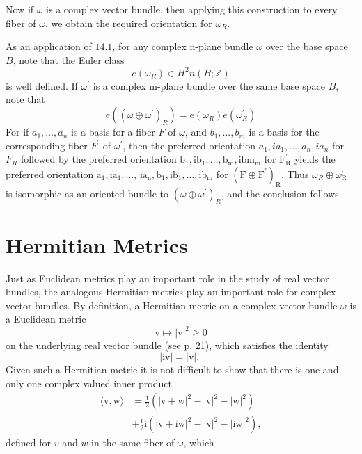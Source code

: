 \documentclass[10pt]{article}
\begin{document}
Now if $\omega$ is a complex vector bundle, then applying this construction to every fiber of $\omega$, we obtain the required orientation for $\omega_{R}$.

As an application of $14.1$, for any complex n-plane bundle $\omega$ over the base space $B$, note that the Euler class
$$
e\left(\omega_{R}\right) \in H^{2} n(B ; \mathbb{Z})
$$
is well defined. If $\omega^{\prime}$ is a complex m-plane bundle over the same base space $B$, note that
$$
e\left(\left(\omega \oplus \omega^{\prime}\right)_{R}\right)=e\left(\omega_{R}\right) e\left(\omega_{R}^{\prime}\right)
$$
For if $a_{1}, \ldots, a_{n}$ is a basis for a fiber $F$ of $\omega$, and $b_{1}, \ldots, b_{m}$ is a basis for the corresponding fiber $F^{\prime}$ of $\omega^{\prime}$, then the preferred orientation $a_{1}, i a_{1}, \ldots, a_{n}, i a_{n}$ for $F_{R}$ followed by the preferred orientation $\mathrm{b}_{1}, \mathrm{ib}_{1}, \ldots, \mathrm{b}_{\mathrm{m}}, \mathrm{ib} \mathrm{m}_{\mathrm{m}}$ for $\mathrm{F}_{\mathrm{R}}^{\prime}$ yields the preferred orientation $\mathrm{a}_{1}, \mathrm{ia}_{1}, \ldots$, $\mathrm{ia}_{\mathrm{n}}, \mathrm{b}_{1}, \mathrm{ib}_{1}, \ldots, \mathrm{ib}_{\mathrm{m}}$ for $\left(\mathrm{F} \oplus \mathrm{F}^{\prime}\right)_{\mathrm{R}}$. Thus $\omega_{R} \oplus \omega_{\mathrm{R}}^{\prime}$ is isomorphic as an oriented bundle to $\left(\omega \oplus \omega^{\prime}\right)_{R}$, and the conclusion follows.

\section{Hermitian Metrics}
Just as Euclidean metrics play an important role in the study of real vector bundles, the analogous Hermitian metrics play an important role for complex vector bundles. By definition, a Hermitian metric on a complex vector bundle $\omega$ is a Euclidean metric
$$
\mathrm{v} \mapsto|\mathrm{v}|^{2} \geq 0
$$
on the underlying real vector bundle (see p. 21), which satisfies the identity
$$
|\mathrm{iv}|=|\mathrm{v}| \text {. }
$$
Given such a Hermitian metric it is not difficult to show that there is one and only one complex valued inner product
$$
\begin{aligned}
\langle\mathrm{v}, \mathrm{w}\rangle &=\frac{1}{2}\left(|\mathrm{v}+\mathrm{w}|^{2}-|\mathrm{v}|^{2}-|\mathrm{w}|^{2}\right) \\
&+\frac{1}{2} \mathrm{i}\left(|\mathrm{v}+\mathrm{iw}|^{2}-|\mathrm{v}|^{2}-|\mathrm{iw}|^{2}\right),
\end{aligned}
$$
defined for $v$ and $w$ in the same fiber of $\omega$, which
\end{document}
